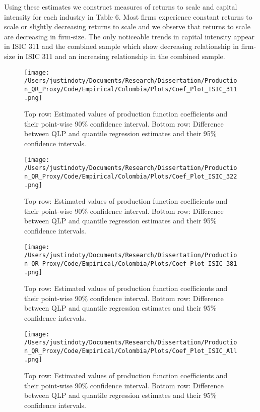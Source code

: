 \documentclass[11pt]{article}
\begin{document}
Using these estimates we construct measures of returns to scale and capital intensity for each industry in Table 6. Most firms experience constant returns to scale or slightly decreasing returns to scale and we observe that returns to scale are decreasing in firm-size. The only noticeable trends in capital intensity appear in ISIC 311 and the combined sample which show decreasing relationship in firm-size in ISIC 311 and an increasing relationship in the combined sample.  

\begin{figure}[H]
\centering
\texttt{[image: /Users/justindoty/Documents/Research/Dissertation/Production\_QR\_Proxy/Code/Empirical/Colombia/Plots/Coef\_Plot\_ISIC\_311.png]}
\caption{Top row: Estimated values of production function coefficients and their point-wise 90\% confidence interval. Bottom row: Difference between QLP and quantile regression estimates and their 95\% confidence intervals.}
\label{fig:COL311}
\end{figure}

\begin{figure}[H]
\centering
\texttt{[image: /Users/justindoty/Documents/Research/Dissertation/Production\_QR\_Proxy/Code/Empirical/Colombia/Plots/Coef\_Plot\_ISIC\_322.png]}
\caption{Top row: Estimated values of production function coefficients and their point-wise 90\% confidence interval. Bottom row: Difference between QLP and quantile regression estimates and their 95\% confidence intervals.}
\label{fig:COL321}
\end{figure}

\begin{figure}[H]
\centering
\texttt{[image: /Users/justindoty/Documents/Research/Dissertation/Production\_QR\_Proxy/Code/Empirical/Colombia/Plots/Coef\_Plot\_ISIC\_381.png]}
\caption{Top row: Estimated values of production function coefficients and their point-wise 90\% confidence interval. Bottom row: Difference between QLP and quantile regression estimates and their 95\% confidence intervals.}
\label{fig:COL381}
\end{figure}

\begin{figure}[H]
\centering
\texttt{[image: /Users/justindoty/Documents/Research/Dissertation/Production\_QR\_Proxy/Code/Empirical/Colombia/Plots/Coef\_Plot\_ISIC\_All.png]}
\caption{Top row: Estimated values of production function coefficients and their point-wise 90\% confidence interval. Bottom row: Difference between QLP and quantile regression estimates and their 95\% confidence intervals.}
\label{fig:COLall}
\end{figure}
\end{document}

